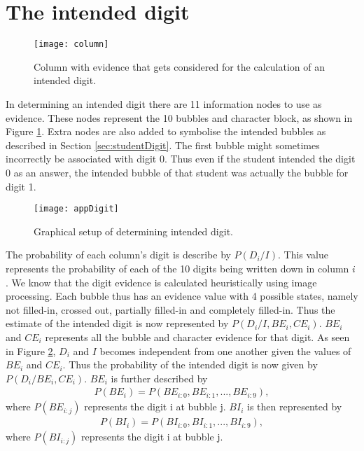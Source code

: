 \section{The intended digit}

\begin{figure}
  \centering
  \texttt{[image: column]}\\
  \caption{Column with evidence that gets considered for the calculation of an intended digit.}
  \label{fig:column}
\end{figure}

In determining an intended digit there are 11 information nodes to use as evidence. These nodes represent the 10 bubbles and character block, as shown in Figure \ref{fig:column}. Extra nodes are also added to symbolise the intended bubbles as described in Section \ref{sec:studentDigit}. The first bubble might sometimes incorrectly be associated with digit 0. Thus even if the student intended the digit 0 as an answer, the intended bubble of that student was actually the bubble for digit 1.

\begin{figure}
  \centering
  \texttt{[image: appDigit]}\\
  \caption{Graphical setup of determining intended digit.}
  \label{fig:appDigit}
\end{figure}

The probability of each column's digit is describe by $P(D_i/I)$. This value represents the probability of each of the 10 digits being written down in column $i$ . We know that the digit evidence is calculated heuristically using image processing. Each bubble thus has an evidence value with 4 possible states, namely not filled-in, crossed out, partially filled-in and completely filled-in. Thus the estimate of the intended digit is now represented by $P(D_i/I,BE_i,CE_i)$. $BE_i$ and $CE_i$ represents all the bubble and character evidence for that digit. As seen in Figure \ref{fig:appDigit}, $D_i$ and $I$ becomes independent from one another given the values of $BE_i$ and $CE_i$. Thus the probability of the intended digit is now given by $P(D_i/BE_i,CE_i)$.
$BE_i$ is further described by 
\begin{align}
  P(BE_i) =  P(BE_{i:0},BE_{i:1},...,BE_{i:9}),
\label{eqn:ansIndep}
\end{align}
where  $P(BE_{i:j})$ represents the digit i at bubble j. $BI_i$ is then represented by
\begin{align}
  P(BI_i) =  P(BI_{i:0},BI_{i:1},...,BI_{i:9}),
\label{eqn:ansIndep}
\end{align}
where  $P(BI_{i:j})$ represents the digit i at bubble j.

